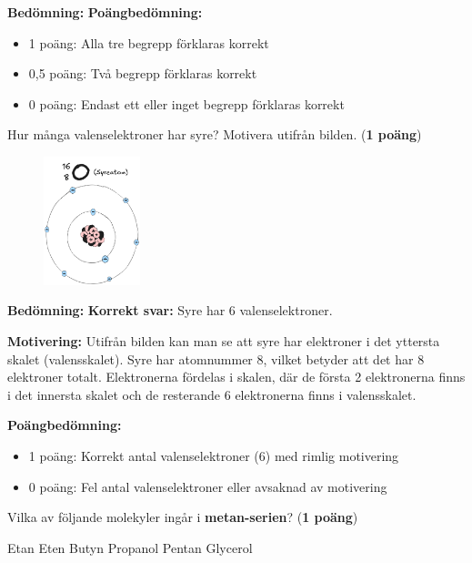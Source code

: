 \documentclass[12pt]{exam}
\newenvironment{answer}
  {\begin{framed}\color{blue}\textbf{Bedömning:} }
  {\end{framed}}
\begin{document}
\begin{questions}
\begin{answer}
\textbf{Poängbedömning:}
\begin{itemize}
  \item 1 poäng: Alla tre begrepp förklaras korrekt
  \item 0,5 poäng: Två begrepp förklaras korrekt
  \item 0 poäng: Endast ett eller inget begrepp förklaras korrekt
\end{itemize}
\end{answer}
\vspace{5mm}

\question Hur många valenselektroner har syre? Motivera utifrån bilden. (\textbf{1 poäng})

\begin{figure}[h]
  \centering
  \includegraphics[width=0.25\textwidth]{syre-atom.png}
\end{figure}

\begin{answer}
\textbf{Korrekt svar:} Syre har 6 valenselektroner.

\textbf{Motivering:} Utifrån bilden kan man se att syre har elektroner i det yttersta skalet (valensskalet). Syre har atomnummer 8, vilket betyder att det har 8 elektroner totalt. Elektronerna fördelas i skalen, där de första 2 elektronerna finns i det innersta skalet och de resterande 6 elektronerna finns i valensskalet.

\textbf{Poängbedömning:}
\begin{itemize}
  \item 1 poäng: Korrekt antal valenselektroner (6) med rimlig motivering
  \item 0 poäng: Fel antal valenselektroner eller avsaknad av motivering
\end{itemize}
\end{answer}
\break

\question Vilka av följande molekyler ingår i \textbf{metan-serien}? (\textbf{1 poäng})
\begin{checkboxes}
  \choice \textcolor{blue}{\checkmark} Etan
  \choice Eten
  \choice Butyn
  \choice Propanol
  \choice \textcolor{blue}{\checkmark} Pentan
  \choice Glycerol
\end{checkboxes}
\vspace{5mm}


\end{questions}
\end{document}
